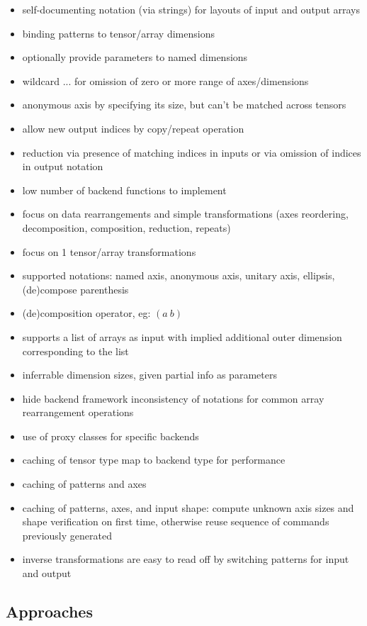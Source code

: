\documentclass[8pt]{extarticle}
\begin{document}
\begin{multicols*}{2}
  \begin{itemize}
  \item self-documenting notation (via strings) for layouts of input and output arrays
  \item binding patterns to tensor/array dimensions
  \item optionally provide parameters to named dimensions
  \item  wildcard $...$ for omission of zero or more range of axes/dimensions
  \item anonymous axis by specifying its size, but can't be matched across tensors
  \item allow new output indices by copy/repeat operation
  \item reduction via presence of matching indices in inputs or via omission of indices in output notation
  \item low number of backend functions to implement
  \item focus on data rearrangements and simple transformations (axes reordering, decomposition, composition, reduction, repeats)
  \item focus on 1 tensor/array transformations
  \item supported notations: named axis, anonymous axis, unitary axis, ellipsis, (de)compose parenthesis
  \item (de)composition operator, eg: $(a\ b)$
  \item supports a list of arrays as input with implied additional outer dimension corresponding to the list
  \item inferrable dimension sizes, given partial info as parameters
  \item hide backend framework inconsistency of notations for common array rearrangement operations
  \item use of proxy classes for specific backends
  \item caching of tensor type map to backend type for performance
  \item caching of patterns and axes
  \item caching of patterns, axes, and input shape: compute unknown axis sizes and shape verification on first time, otherwise reuse sequence of commands previously generated
  \item inverse transformations are easy to read off by switching patterns for input and output
  \end{itemize}

  \subsection{Approaches}
  

\end{multicols*}
\end{document}
